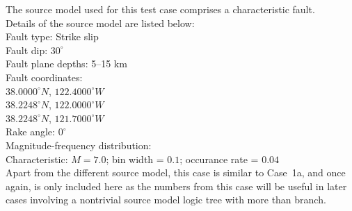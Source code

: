 The source model used for this test case comprises a characteristic fault.\\

\noindent Details of the source model are listed below:\\

\noindent
Fault type: Strike slip\\
Fault dip: $30^{\circ}$\\
Fault plane depths: 5--15 km\\
Fault coordinates:\\
$38.0000^{\circ} N$, $122.4000^{\circ} W$\\
$38.2248^{\circ} N$, $122.0000^{\circ} W$\\
$38.2248^{\circ} N$, $121.7000^{\circ} W$\\
Rake angle: $0^{\circ}$\\
Magnitude-frequency distribution:\\
Characteristic: $M = 7.0$; bin width = $0.1$; occurance rate = $0.04$\\

Apart from the different source model, this case is similar to Case~1a, and once again, is only included here as the numbers from this case will be useful in later cases involving a nontrivial source model logic tree with more than branch.